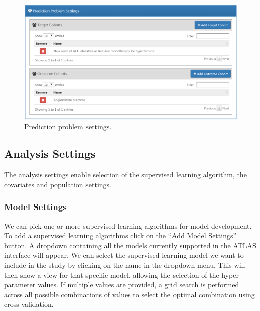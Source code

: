 \documentclass[11pt]{book}
\theoremstyle{definition}
\theoremstyle{definition}
\theoremstyle{definition}
\theoremstyle{remark}
\begin{document}
\begin{figure}

{\centering \includegraphics[width=1\linewidth]{images/PatientLevelPrediction/problemSettings} 

}

\caption{Prediction problem settings.}\label{fig:problemSettings}
\end{figure}

\hypertarget{analysis-settings}{%
\subsection{Analysis Settings}\label{analysis-settings}}

The analysis settings enable selection of the supervised learning algorithm, the covariates and population settings.

\hypertarget{model-settings}{%
\subsubsection*{Model Settings}\label{model-settings}}

We can pick one or more supervised learning algorithms for model development. To add a supervised learning algorithms click on the ``Add Model Settings'' button. A dropdown containing all the models currently supported in the ATLAS interface will appear. We can select the supervised learning model we want to include in the study by clicking on the name in the dropdown menu. This will then show a view for that specific model, allowing the selection of the hyper-parameter values. If multiple values are provided, a grid search is performed across all possible combinations of values to select the optimal combination using cross-validation.
\end{document}
